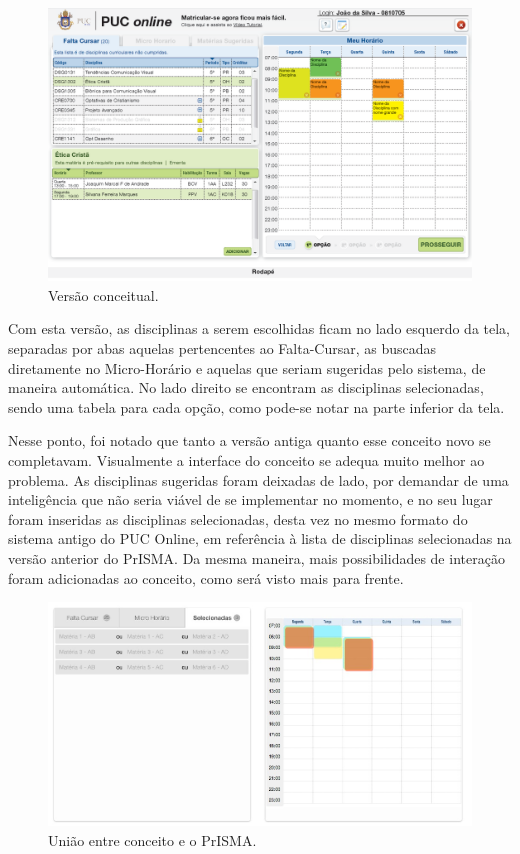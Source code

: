 \documentclass[graduacao,brazil]{ThesisPUC}
\begin{document}
\begin{figure}[H]
    \centering
    \includegraphics[width=\linewidth]{img/designer.png}
    \caption{Versão conceitual.}
\end{figure}

Com esta versão, as disciplinas a serem escolhidas ficam no lado esquerdo da tela, separadas por abas aquelas pertencentes ao Falta-Cursar, as buscadas diretamente no Micro-Horário e aquelas que seriam sugeridas pelo sistema, de maneira automática. No lado direito se encontram as disciplinas selecionadas, sendo uma tabela para cada opção, como pode-se notar na parte inferior da tela.

Nesse ponto, foi notado que tanto a versão antiga quanto esse conceito novo se completavam. Visualmente a interface do conceito se adequa muito melhor ao problema. As disciplinas sugeridas foram deixadas de lado, por demandar de uma inteligência que não seria viável de se implementar no momento, e no seu lugar foram inseridas as disciplinas selecionadas, desta vez no mesmo formato do sistema antigo do PUC Online, em referência à lista de disciplinas selecionadas na versão anterior do PrISMA. Da mesma maneira, mais possibilidades de interação foram adicionadas ao conceito, como será visto mais para frente.

\begin{figure}[H]
    \centering
    \includegraphics[width=\linewidth]{img/prisma-WF.jpg}
    \caption{União entre conceito e o PrISMA.}
\end{figure}
\end{document}
